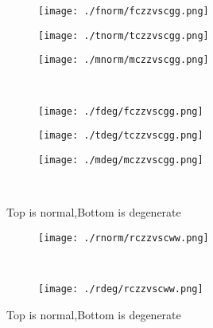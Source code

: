 \documentclass[aps,floats,floatfix,nofootinbib]{revtex4-1}
\begin{document}
\begin{center}
\begin{figure}
\begin{subfigure}{0.3\textwidth}
\texttt{[image: ./fnorm/fczzvscgg.png]}
\label{}
\end{subfigure}
\begin{subfigure}{0.3\textwidth}
\texttt{[image: ./tnorm/tczzvscgg.png]}
\label{}
\end{subfigure}
\begin{subfigure}{0.3\textwidth}
\texttt{[image: ./mnorm/mczzvscgg.png]}
\label{}
\end{subfigure}\\
\begin{subfigure}{0.3\textwidth}
\texttt{[image: ./fdeg/fczzvscgg.png]}
\label{}
\end{subfigure}
\begin{subfigure}{0.3\textwidth}
\texttt{[image: ./tdeg/tczzvscgg.png]}
\label{}
\end{subfigure}
\begin{subfigure}{0.3\textwidth}
\texttt{[image: ./mdeg/mczzvscgg.png]}
\label{}
\end{subfigure}\\
\caption{Top is normal,Bottom is degenerate}
\end{figure}
\end{center}

\begin{center}
\begin{figure}
\begin{subfigure}{0.95\textwidth}
\texttt{[image: ./rnorm/rczzvscww.png]}
\label{}
\end{subfigure}\\
\begin{subfigure}{0.95\textwidth}
\texttt{[image: ./rdeg/rczzvscww.png]}
\label{}
\end{subfigure}
\caption{Top is normal,Bottom is degenerate}
\end{figure}
\end{center}
\end{document}
